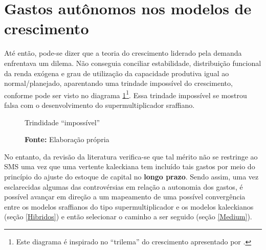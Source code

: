 \section{Gastos autônomos nos modelos de crescimento}

Até então, pode-se dizer que a teoria do crescimento liderado pela demanda enfrentava um dilema. Não conseguia conciliar estabilidade, distribuição funcional da renda exógena e grau de utilização da capacidade produtiva igual ao normal/planejado, aparentando uma trindade impossível do crescimento, conforme pode ser visto no diagrama \ref{diagrama}\footnote{Este diagrama é inspirado no ``trilema'' do crescimento apresentado por \textcite{cesaratto_neo-kaleckian_2015}.}.
Essa trindade impossível se mostrou falsa com o desenvolvimento do supermultiplicador sraffiano.


\begin{figure}[htb]
	\caption{Trindidade ``impossível''}
	\label{diagrama}
	\begin{center}
	\end{center}
	\caption*{\textbf{Fonte:} Elaboração própria}
\end{figure}

No entanto, da revisão da literatura verifica-se que tal mérito não se restringe ao SMS uma vez que uma vertente kaleckiana tem incluído tais gastos por meio do princípio do ajuste do estoque de capital no \textbf{longo prazo}.
Sendo assim, uma vez esclarecidas algumas das controvérsias em relação a autonomia dos gastos, é possível avançar em direção a um mapeamento de uma possível convergência entre os modelos sraffianos do tipo supermultiplicador e os modelos kaleckianos (seção \ref{Hibridos}) e então selecionar o caminho a ser seguido (seção \ref{Medium}).



